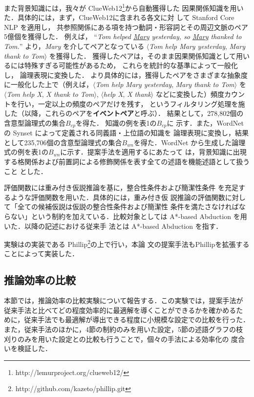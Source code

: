 \documentclass[japanese]{jnlp_1.4}
\begin{document}
また背景知識には，我々が
ClueWeb12\footnote{http://lemurproject.org/clueweb12/}から自動獲得した
因果関係知識を用いた．具体的には，まず，ClueWeb12に含まれる各文に対
して Stanford Core NLP を適用し，
	共参照関係にある項を持つ動詞・形容詞とその周辺文脈のペア
	5億個を獲得した．
	例えば，
	``\textit{Tom helped \underline{Mary} yesterday,
	so \underline{Mary} thanked to Tom.}''
	より，\textit{Mary} を介してペアとなっている $\langle$\textit{Tom help Mary yesterday}, \textit{Mary thank to Tom}$\rangle$
	を獲得した．
	獲得したペアは，そのまま因果関係知識として用いるには特殊すぎる可能性があるため，
	これらを統計的な基準によって一般化し，
	論理表現に変換した．
	より具体的には，獲得したペアをさまざまな抽象度に一般化した上で（例えば，$\langle$\textit{Tom help Mary yesterday}, \textit{Mary thank to Tom}$\rangle$ を $\langle$\textit{Tom help X}, \textit{X thank to Tom}$\rangle$, $\langle$\textit{help X}, \textit{X thank}$\rangle$ などに変換した）頻度カウントを行い，一定以上の頻度のペアだけを残す，
	というフィルタリング処理を施した（以降，これらのペアを\textbf{イベントペア}と呼ぶ）．
結果として，278,802個の含意型論理式の集合$B_\mathit{ep}$を得た．
	知識の例を表1の$B_\mathit{ep}$に
示す．また，WordNetの Synset によって定義される同義語・上位語の知識を
論理表現に変換し，結果として235,706個の含意型論理式の集合$B_\mathit{wn}$を得た．WordNet
から生成した論理式の例を表1の$B_\mathit{wn}$に示す．提案手法を適用するにあたって
は，背景知識に出現する格関係および前置詞による修飾関係を表す全ての述語を機能述語として扱うこと
とした．

評価関数には重み付き仮説推論\cite{Hobbs93}を基に，整合性条件および簡潔性条件
を充足するような評価関数を用いた．具体的には，重み付き仮
説推論の評価関数に対して「全ての候補仮説は仮説の整合性条件および簡潔性
条件を満たさなければならない」という制約を加えている．比較対象としては
A*-based Abduction \cite{Yamamoto15}を用いた．以降の記述における従来手
法とは A*-based Abduction を指す．

実験は\cite{Yamamoto15}の実装である
Phillip\footnote{http://github.com/kazeto/phillip.git}の上で行い，本論
文の提案手法もPhillipを拡張することによって実装した．


\subsection{推論効率の比較}

本節では，推論効率の比較実験について報告する．この実験では，提案手法が
従来手法と比べてどの程度効率的に最適解を導くことができるかを確かめるた
めに，従来手法でも最適解が導出できる程度に小規模な設定での比較を行った．
また，従来手法のほかに，4節の制約のみを用いた設定，5節の述語グラフの枝
刈りのみを用いた設定との比較も行うことで，個々の手法による効率化の
度合いを検証した．
\end{document}
